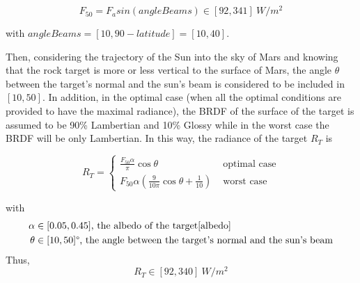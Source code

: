 \begin{equation}
F_{50} = F_asin(angleBeams) \in [92, 341] \ W/m^2
\end{equation}

with $angleBeams = [10, 90-latitude] = [10, 40]$\textdegree.


Then, considering the trajectory of the Sun into the sky of Mars and knowing that the rock target is more or less vertical to the surface of Mars, the angle $\theta$ between the target's normal and the sun's beam is considered to be included in $[10, 50]$\textdegree. In addition, in the optimal case (when all the optimal conditions are provided to have the maximal radiance), the BRDF of the surface of the target is assumed to be 90\% Lambertian and 10\% Glossy while in the worst case the BRDF will be only Lambertian. In this way, the radiance of the target $R_T$ is

\begin{equation}
\label{eq:Radiance Target}
R_T = \left\{
	\begin{array}{ll}
		\frac{F_{50}\alpha}{\pi}\cos \theta & \mbox{ optimal case} \\
		F_{50}\alpha(\frac{9}{10\pi}\cos\theta + \frac{1}{10}) & \mbox{ worst case}
	\end{array}
\right.
\end{equation}

with 
\begin{align*}
	\alpha & \in [0.05, 0.45]\mbox{, the albedo of the target\ref{albedo}} \\
	\theta & \in [10, 50]\mbox{\textdegree, the angle between the target's normal and the sun's beam}
\end{align*}
Thus, 
\begin{equation}
R_T \in [92, 340] \ W/m^2
\end{equation}





